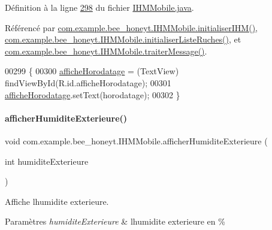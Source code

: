 Définition à la ligne \hyperlink{_i_h_m_mobile_8java_source_l00298}{298} du fichier \hyperlink{_i_h_m_mobile_8java_source}{I\+H\+M\+Mobile.\+java}.



Référencé par \hyperlink{_i_h_m_mobile_8java_source_l00152}{com.\+example.\+bee\+\_\+honeyt.\+I\+H\+M\+Mobile.\+initialiser\+I\+H\+M()}, \hyperlink{_i_h_m_mobile_8java_source_l00170}{com.\+example.\+bee\+\_\+honeyt.\+I\+H\+M\+Mobile.\+initialiser\+Liste\+Ruches()}, et \hyperlink{_i_h_m_mobile_8java_source_l00374}{com.\+example.\+bee\+\_\+honeyt.\+I\+H\+M\+Mobile.\+traiter\+Message()}.


\begin{DoxyCode}
00299     \{
00300         \hyperlink{classcom_1_1example_1_1bee__honeyt_1_1_i_h_m_mobile_a624f148d43715aa48ba84e749637c2a5}{afficheHorodatage} = (TextView) findViewById(R.id.afficheHorodatage);
00301         \hyperlink{classcom_1_1example_1_1bee__honeyt_1_1_i_h_m_mobile_a624f148d43715aa48ba84e749637c2a5}{afficheHorodatage}.setText(horodatage);
00302     \}
\end{DoxyCode}
\mbox{\label{classcom_1_1example_1_1bee__honeyt_1_1_i_h_m_mobile_a8571df97f453ee83c35d653b06127691}} 
\paragraph{\texorpdfstring{afficher\+Humidite\+Exterieure()}{afficherHumiditeExterieure()}}
{\footnotesize\ttfamily void com.\+example.\+bee\+\_\+honeyt.\+I\+H\+M\+Mobile.\+afficher\+Humidite\+Exterieure (\begin{DoxyParamCaption}\item[{int}]{humidite\+Exterieure }\end{DoxyParamCaption})}



Affiche l\textquotesingle{}humidite exterieure. 


\begin{DoxyParams}{Paramètres}
{\em humidite\+Exterieure} & l\textquotesingle{}humidite exterieure en \% \\
\hline
\end{DoxyParams}


